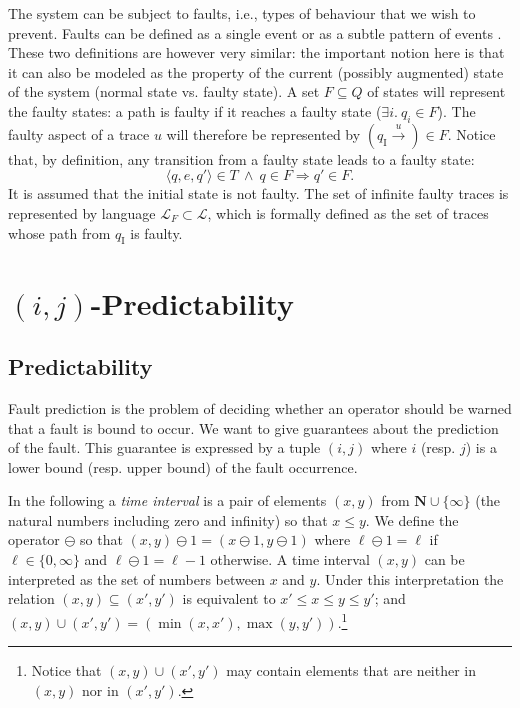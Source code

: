 \documentclass{article}
\newcommand{\naturals}{\mathbf{N}}
\newcommand{\qi}[0]{q_{\mathrm{I}}}
\newcommand{\trans}[1]{\stackrel{#1}{\rightarrow}}
\newcommand{\lang}[0]{\mathcal{L}}
\newcommand{\langf}[1]{\lang_{#1}}
\newcommand{\set}[1]{\{#1\}}
\begin{document}
The system can be subject to faults, 
i.e., types of behaviour that we wish to prevent.  
Faults can be defined as a single event 
or as a subtle pattern of events \cite{jeron-etal::dx::06}.  
These two definitions are however very similar: 
the important notion here 
is that it can also be modeled as the property 
of the current (possibly augmented) state of the system 
(normal state vs. faulty state).  
A set $F \subseteq Q$ of states will represent the faulty states: 
a path is faulty if it reaches a faulty state 
($\exists i.\ q_i \in F$).  
The faulty aspect of a trace $u$ 
will therefore be represented by $(\qi \trans{u}) \in F$.  
Notice that, by definition, any transition from a faulty state 
leads to a faulty state: 
\begin{displaymath}
  \langle q,e,q'\rangle \in T \ \land\ q \in F \Rightarrow q' \in F.  
\end{displaymath}
It is assumed that the initial state is not faulty.  
The set of infinite faulty traces is represented 
by language $\langf{F} \subset \lang$, 
which is formally defined as the set of traces 
whose path from $\qi$ is faulty.  

\section{$(i,j)$-Predictability}
\label{sec::defi}
\subsection{Predictability}

Fault prediction is the problem of deciding 
whether an operator should be warned that a fault is bound to occur.  
We want to give guarantees about the prediction of the fault.  
This guarantee is expressed by a tuple $(i,j)$ 
where $i$ (resp. $j$) is a lower bound (resp. upper bound) 
of the fault occurrence.  

In the following a \emph{time interval} is a pair of elements $(x,y)$ 
from $\naturals \cup \set{\infty}$ 
(the natural numbers including zero and infinity) 
so that $x \le y$.  
We define the operator $\ominus$ 
so that $(x,y) \ominus 1 = (x \ominus 1,y \ominus 1)$ 
where $\ell \ominus 1 = \ell$ if $\ell \in \set{0,\infty}$ 
and $\ell \ominus 1 = \ell - 1$ otherwise.  
A time interval $(x,y)$ can be interpreted 
as the set of numbers between $x$ and $y$.  
Under this interpretation 
the relation $(x,y) \subseteq (x',y')$ 
is equivalent to $x' \le x \le y \le y'$; 
and $(x,y) \cup (x',y') = (\min(x,x'),\max(y,y'))$.\footnote{Notice that $(x,y) \cup (x',y')$ may contain elements 
that are neither in $(x,y)$ nor in $(x',y')$.}
\end{document}
